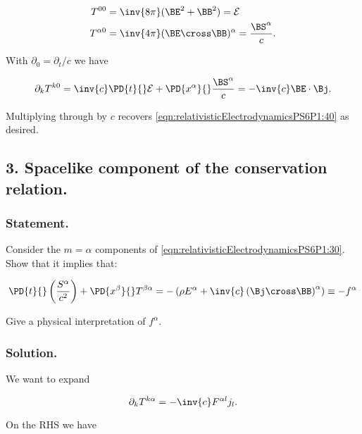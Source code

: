 \begin{align}\label{eqn:relativisticElectrodynamicsPS6P1:180}
T^{ 0 0 } &= \inv{8 \pi} ( \BE^2 + \BB^2 ) = \mathcal{E} \\
T^{\alpha 0} &= \inv{4 \pi} (\BE \cross \BB)^\alpha = \frac{\BS^\alpha}{c}.
\end{align}

With $\partial_0 = \partial_t/c$ we have

\begin{equation}\label{eqn:relativisticElectrodynamicsPS6P1:160}
\partial_k T^{k 0} = \inv{c} \PD{t}{} \mathcal{E} + \PD{x^\alpha}{} \frac{\BS^\alpha}{c} = -\inv{c} \BE \cdot \Bj.
\end{equation}

Multiplying through by $c$ recovers \ref{eqn:relativisticElectrodynamicsPS6P1:40} as desired.

\subsection{3. Spacelike component of the conservation relation.}

\subsubsection{Statement.}

Consider the $m = \alpha$ components of \ref{eqn:relativisticElectrodynamicsPS6P1:30}.  Show that it implies that:

\begin{equation}\label{eqn:relativisticElectrodynamicsPS6P1:41}
\PD{t}{}\left( \frac{S^\alpha}{c^2} \right) + \PD{x^\beta}{} T^{\beta \alpha}
= - \left( \rho E^\alpha + \inv{c} \left( \Bj \cross \BB \right)^\alpha \right) \equiv - f^\alpha
\end{equation}

Give a physical interpretation of $f^\alpha$.

\subsubsection{Solution.}

We want to expand

\begin{equation}\label{eqn:relativisticElectrodynamicsPS6P1:42}
\partial_k T^{k \alpha} = -\inv{c} F^{\alpha l} j_l.
\end{equation}

On the RHS we have

